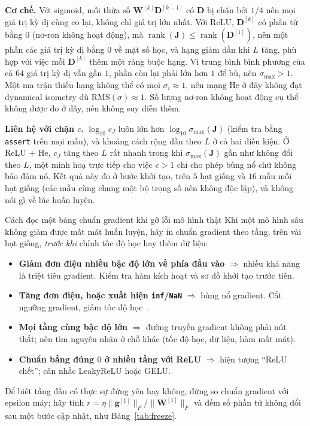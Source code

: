 \textbf{Cơ chế.} Với sigmoid, mỗi thừa số $\mathbf{W}^{[k]}\mathbf{D}^{[k-1]}$ có $\mathbf{D}$ bị
chặn bởi $1/4$ nên mọi giá trị kỳ dị cùng co lại, không chỉ giá trị lớn nhất. Với ReLU,
$\mathbf{D}^{[k]}$ có phần tử bằng $0$ (nơ-ron không hoạt động), mà
$\operatorname{rank}(\mathbf{J})\le\operatorname{rank}(\mathbf{D}^{[1]})$, nên một phần các giá trị
kỳ dị bằng $0$ về mặt số học, và hạng giảm dần khi $L$ tăng, phù hợp với việc mỗi $\mathbf{D}^{[k]}$ thêm một
ràng buộc hạng. Vì trung bình bình phương của cả $64$ giá trị kỳ dị vẫn gần $1$, phần còn
lại phải lớn hơn $1$ để bù, nên $\sigma_{\max}>1$. Một ma trận thiếu hạng không thể có mọi $\sigma_i\approx1$, nên mạng He ở đây
không đạt dynamical isometry dù $\mathrm{RMS}(\sigma)\approx1$. Số lượng nơ-ron không hoạt động cụ thể không được đo ở đây, nên
không suy diễn thêm.

\textbf{Liên hệ với chặn $c$.} $\log_{10}c_J$ luôn lớn hơn $\log_{10}\sigma_{\max}(\mathbf{J})$
(kiểm tra bằng \texttt{assert} trên mọi mẫu), và khoảng cách rộng dần theo $L$ ở cả hai
điều kiện. Ở ReLU + He, $c_J$ tăng theo $L$ rất nhanh trong khi $\sigma_{\max}(\mathbf{J})$ gần như không
đổi theo $L$, một minh hoạ trực tiếp cho việc $c>1$ chỉ cho phép bùng nổ chứ không
bảo đảm nó. Kết quả này đo ở bước khởi tạo, trên $5$ hạt giống và $16$ mẫu mỗi hạt giống
(các mẫu cùng chung một bộ trọng số nên không độc lập), và không nói gì về lúc huấn luyện.

\begin{guidelinebox}{Cách đọc một bảng chuẩn gradient khi gỡ lỗi mô hình thật}
Khi một mô hình sâu không giảm được mất mát huấn luyện, hãy in chuẩn gradient
theo tầng, trên vài hạt giống, \emph{trước khi} chỉnh tốc độ học hay thêm dữ liệu:
\begin{itemize}[leftmargin=*, itemsep=1pt]
  \item \textbf{Giảm đơn điệu nhiều bậc độ lớn về phía đầu vào} $\Rightarrow$
    nhiều khả năng là triệt tiêu gradient. Kiểm tra hàm kích hoạt và sơ đồ khởi
    tạo trước tiên.
  \item \textbf{Tăng đơn điệu, hoặc xuất hiện \texttt{inf}/\texttt{NaN}}
    $\Rightarrow$ bùng nổ gradient. Cắt ngưỡng gradient, giảm tốc độ
    học~\cite{Pascanu2013}.
  \item \textbf{Mọi tầng cùng bậc độ lớn} $\Rightarrow$ đường truyền gradient
    không phải nút thắt; nên tìm nguyên nhân ở chỗ khác (tốc độ học, dữ liệu,
    hàm mất mát).
  \item \textbf{Chuẩn bằng đúng $0$ ở nhiều tầng với ReLU} $\Rightarrow$ hiện
    tượng ``ReLU chết''; cân nhắc LeakyReLU hoặc GELU.
\end{itemize}
Để biết tầng đầu có thực sự đứng yên hay không, đừng so chuẩn gradient với
epsilon máy; hãy tính $r = \eta\|\mathbf{g}^{[1]}\|_F/\|\mathbf{W}^{[1]}\|_F$ và
đếm số phần tử không đổi sau một bước cập nhật, như Bảng~\ref{tab:freeze}.
\end{guidelinebox}

